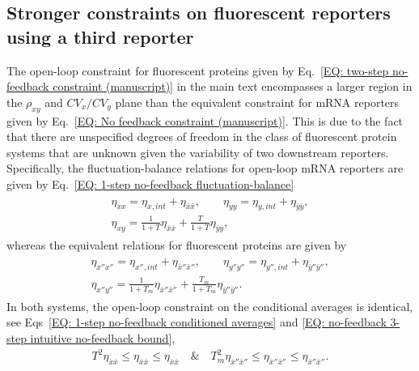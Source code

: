\documentclass[%
 reprint,prx,
superscriptaddress,
%
%
%
%
%
%
%
%
%
 amsmath,amssymb,
 aps,
%
%
%
%
%
%
]{revtex4-2}
\begin{document}
{{\subsection{Stronger constraints on fluorescent reporters using a third reporter}
\label{SEC: Stronger constraints}
The open-loop constraint for fluorescent proteins given by Eq.~\eqref{EQ: two-step no-feedback constraint (manuscript)} in the main text encompasses a larger region in the $\rho_{xy}$ and $CV_{x}/CV_{y}$ plane than the equivalent constraint for mRNA reporters given by Eq.~\eqref{EQ: No feedback constraint (manuscript)}. This is due to the fact that there are unspecified degrees of freedom in the class of fluorescent protein systems that are unknown given the variability of two downstream reporters. Specifically, the fluctuation-balance relations for open-loop mRNA reporters are given by Eq.~\eqref{EQ: 1-step no-feedback fluctuation-balance}
\begin{align}
\begin{split}
\eta_{xx} = \eta_{x,int} + \eta_{\bar{x}\bar{x}}, \qquad \eta_{yy} = \eta_{y,int} + \eta_{\bar{y}\bar{y}}, \\	 
 \eta_{xy} = \frac{1}{1+T}\eta_{\bar{x}\bar{x}}  + \frac{T}{1+T}\eta_{\bar{y}\bar{y}}  , \qquad
 \end{split}
\label{EQ: FP three reporters mrna eqns}
\end{align}
whereas the equivalent relations for fluorescent proteins are given by
\begin{align}
\begin{split}
 \eta_{x''x''} = \eta_{x'',int} +\eta_{\bar{x}''\bar{x}''} , \qquad 
 \eta_{y''y''} = \eta_{y'',int} +\eta_{\bar{y}''\bar{y}''}, \\ 
 \eta_{x''y''}  = \frac{1}{1+T_{m}}\eta_{\bar{x}''\bar{x}''} + \frac{T_{m}}{1+T_{m}}\eta_{\bar{y}''\bar{y}''}. \qquad 
\end{split}
 \label{EQ: FP three reporters FP eqns}
\end{align}
In both systems, the open-loop constraint on the conditional averages is identical, see Eqs~\eqref{EQ: 1-step no-feedback conditioned averages} and \eqref{EQ: no-feedback 3-step intuitive no-feedback bound},
\begin{align}
   T^{2}\eta_{\bar{x}\bar{x}} \leq \eta_{\bar{x}\bar{x}} \leq \eta_{\bar{x}\bar{x}} \quad \text{\&} \quad T_{m}^{2}\eta_{\bar{x}''\bar{x}''} \leq \eta_{\bar{x}''\bar{x}''} \leq \eta_{\bar{x}''\bar{x}''} .
   \label{EQ: FP three reporters no-feedback constraints}
\end{align}
}}
\end{document}
